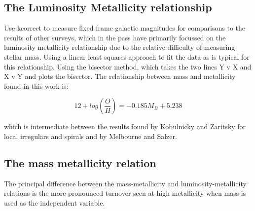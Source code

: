 \documentclass{literature}
\begin{document}
\subsection{The Luminosity Metallicity relationship}
Use kcorrect \citep{Blanton2003} to measure fixed frame galactic magnitudes for comparisons to the results of other surveys, which in the pass have primarily focussed on the luminosity metallicity relationship due to the relative difficulty of measuring stellar mass. Using a linear least squares approach to fit the data as is typical for this relationship. Using the bisector method, which takes the two lines Y v X and X v Y and plots the bisector. The relationship between mass and metallicity found in this work is: 

\begin{equation}
 	12 + log(\frac{O}{H}) = -0.185M_{B} + 5.238
 \end{equation} 

which is intermediate between the results found by Kobulnicky and Zaritsky \citep{Kobulnicky1999} for local irregulars and spirals and by Melbourne and Salzer. 
\subsection{The mass metallicity relation}
The principal difference between the mass-metallicity and luminosity-metallicity relations is the more pronounced turnover seen at high metallicity when mass is used as the independent variable.
\end{document}
